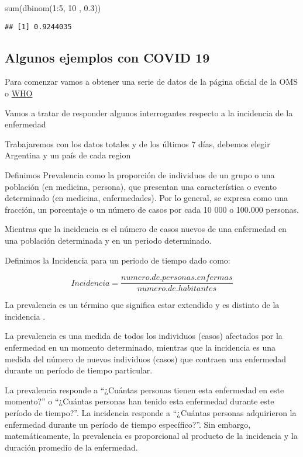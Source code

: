\documentclass[
]{article}
\newenvironment{Shaded}{\begin{snugshade}}{\end{snugshade}}
\newcommand{\DecValTok}[1]{\textcolor[rgb]{0.00,0.00,0.81}{#1}}
\newcommand{\FloatTok}[1]{\textcolor[rgb]{0.00,0.00,0.81}{#1}}
\newcommand{\FunctionTok}[1]{\textcolor[rgb]{0.00,0.00,0.00}{#1}}
\newcommand{\NormalTok}[1]{#1}
\newcommand{\SpecialCharTok}[1]{\textcolor[rgb]{0.00,0.00,0.00}{#1}}
\begin{document}
\begin{Shaded}
\begin{Highlighting}[]
\FunctionTok{sum}\NormalTok{(}\FunctionTok{dbinom}\NormalTok{(}\DecValTok{1}\SpecialCharTok{:}\DecValTok{5}\NormalTok{, }\DecValTok{10}\NormalTok{ , }\FloatTok{0.3}\NormalTok{))}
\end{Highlighting}
\end{Shaded}

\begin{verbatim}
## [1] 0.9244035
\end{verbatim}

\hypertarget{algunos-ejemplos-con-covid-19}{%
\subsection{Algunos ejemplos con COVID
19}\label{algunos-ejemplos-con-covid-19}}

Para comenzar vamos a obtener una serie de datos de la página oficial de
la OMS o \href{https://covid19.who.int/info}{WHO}

Vamos a tratar de responder algunos interrogantes respecto a la
incidencia de la enfermedad

Trabajaremos con los datos totales y de los últimos 7 días, debemos
elegir Argentina y un país de cada region

Definimos Prevalencia como la proporción de individuos de un grupo o una
población (en medicina, persona), que presentan una característica o
evento determinado (en medicina, enfermedades). Por lo general, se
expresa como una fracción, un porcentaje o un número de casos por cada
10 000 o 100.000 personas.

Mientras que la incidencia es el número de casos nuevos de una
enfermedad en una población determinada y en un periodo determinado.

Definimos la Incidencia para un periodo de tiempo dado como:

\[Incidencia= \frac{numero.de.personas.enfermas}{numero.de.habitantes}\]

La prevalencia es un término que significa estar extendido y es distinto
de la incidencia .

La prevalencia es una medida de todos los individuos (casos) afectados
por la enfermedad en un momento determinado, mientras que la incidencia
es una medida del número de nuevos individuos (casos) que contraen una
enfermedad durante un período de tiempo particular.

La prevalencia responde a ``¿Cuántas personas tienen esta enfermedad en
este momento?'' o ``¿Cuántas personas han tenido esta enfermedad durante
este período de tiempo?''. La incidencia responde a ``¿Cuántas personas
adquirieron la enfermedad durante un período de tiempo específico?''.
Sin embargo, matemáticamente, la prevalencia es proporcional al producto
de la incidencia y la duración promedio de la enfermedad.
\end{document}
